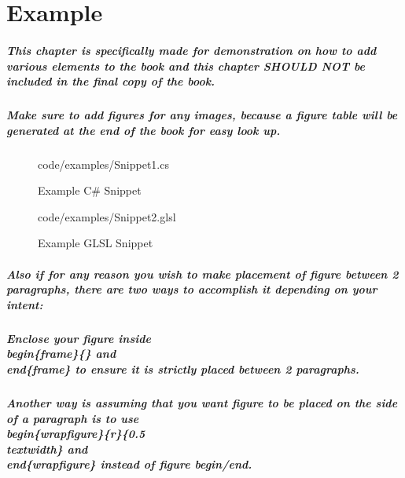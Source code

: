 \chapter*{\textsf{Example}}
\paragraph{
    This chapter is specifically made for demonstration on how to add various elements to the book and this chapter \textbf{SHOULD NOT} be included in the final copy of the book.
}
\paragraph{
    Make sure to add figures for any images, because a figure table will be generated at the end of the book for easy look up.
}
\begin{frame}{}
    \begin{figure}[!ht]
        \centering
        \colorbox{backgroundcolor}{
            \parbox{0.9\textwidth}{
                
                {code/examples/Snippet1.cs}
            }
        }
        \caption{Example C\# Snippet}
        \label{fig:example_cs_snippet}
    \end{figure}
\end{frame}
\begin{frame}{}
    \begin{figure}[!ht]
        \centering
        \colorbox{backgroundcolor}{
            \parbox{0.9\textwidth}{
                
                {code/examples/Snippet2.glsl}
            }
        }
        \caption{Example GLSL Snippet}
        \label{fig:example_glsl_snippet}
    \end{figure}
\end{frame}
\paragraph{
    Also if for any reason you wish to make placement of figure between 2 paragraphs, there are two ways to accomplish it depending on your intent:
}
\paragraph{
    Enclose your figure inside \\begin\{frame\}\{\} and \\end\{frame\} to ensure it is strictly placed between 2 paragraphs.
}
\paragraph{
    Another way is assuming that you want figure to be placed on the side of a paragraph is to use \\begin\{wrapfigure\}\{r\}\{0.5\\textwidth\} and \\end\{wrapfigure\} instead of figure begin/end.
}
